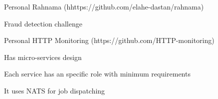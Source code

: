 \begin{cventries}
    \cventry
    {Personal} %
    {Rahnama ({\tiny hhttps://github.com/elahe-dastan/rahnama})} %
    {} %
    {} %
    {
      \begin{cvitems} %
        \item{Fraud detection challenge}
      \end{cvitems}
    }

    \cventry
    {Personal} %
    {HTTP Monitoring ({\tiny https://github.com/HTTP-monitoring})} %
    {} %
    {} %
    {
      \begin{cvitems} %
        \item{Has micro-services design}
        \item{Each service has an specific role with minimum requirements}
        \item{It uses NATS for job dispatching}
      \end{cvitems}
    }

\end{cventries}
